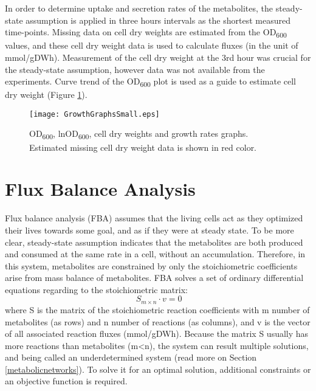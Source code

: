 In order to determine uptake and secretion rates of the metabolites, the steady-state assumption is applied in three hours intervals as the shortest measured time-points. Missing data on cell dry weights are estimated from the OD\textsubscript{600} values, and these cell dry weight data is used to calculate fluxes (in the unit of mmol/gDWh). Measurement of the cell dry weight at the 3rd hour was crucial for the steady-state assumption, however data was not available from the experiments. Curve trend of the OD\textsubscript{600} plot is used as a guide to estimate cell dry weight (Figure \ref{fig:GrowthGraphs}).
\begin{figure}[H]
  \begin{center}
  \texttt{[image: GrowthGraphsSmall.eps]}
  \end{center}
  \caption[OD\textsubscript{600}, lnOD\textsubscript{600}, cell dry weights and growth rates]{OD\textsubscript{600}, lnOD\textsubscript{600}, cell dry weights and growth rates graphs. Estimated missing cell dry weight data is shown in red color.}
\label{fig:GrowthGraphs}
\end{figure}



\section{Flux Balance Analysis}
Flux balance analysis (FBA) assumes that the living cells act as they optimized their lives towards some goal, and as if they were at steady state. To be more clear, steady-state assumption indicates that the metabolites are both produced and consumed at the same rate in a cell, without an accumulation. Therefore, in this system, metabolites are constrained by only the stoichiometric coefficients arise from mass balance of metabolites. FBA solves a set of ordinary differential equations regarding to the stoichiometric matrix:
\begin{equation}
 \ S_{m \times n} \cdot v=0
\end{equation}
\noindent where S is the matrix of the stoichiometric reaction coefficients with m number of metabolites (as rows) and n number of reactions (as columns), and v is the vector of all associated reaction fluxes (mmol/gDWh). Because the matrix S usually has more reactions than metabolites (m<n), the system can result multiple solutions, and being called an underdetermined system (read more on Section \ref{metabolicnetworks}). To solve it for an optimal solution, additional constraints or an objective function is required.

